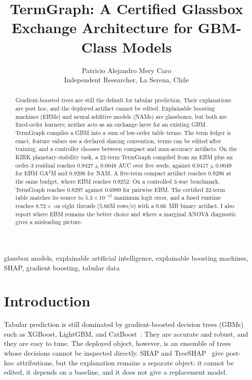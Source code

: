\documentclass[twoside,11pt]{article}
\title{TermGraph: A Certified Glassbox Exchange Architecture for GBM-Class Models}
\author{\name Patricio Alejandro Mery Caro \\
       \addr Independent Researcher, La Serena, Chile}
\begin{document}
\raggedbottom
\maketitle

\begin{abstract}
Gradient-boosted trees are still the default for tabular prediction. Their
explanations are post hoc, and the deployed artifact cannot be edited.
Explainable boosting machines (EBMs) and neural additive models (NAMs) are
glassboxes, but both are fixed-order learners; neither acts as an exchange layer
for an existing GBM. TermGraph compiles a GBM into a sum of low-order table
terms. The term ledger is exact, feature values use a declared sharing
convention, terms can be edited after training, and a controller chooses between
compact and max-accuracy artifacts. On the KIRK planetary-stability task, a
22-term TermGraph compiled from an EBM plus an order-3 residual reaches
$0.9427 \pm 0.0048$ AUC over five seeds, against $0.9417 \pm 0.0049$ for EBM
GA$^2$M and $0.9206$ for NAM. A five-term compact artifact reaches $0.9296$ at
the same budget, where EBM reaches $0.9252$. On a controlled 3-way
benchmark, TermGraph reaches $0.8297$ against $0.6989$ for pairwise EBM. The
certified 22-term table matches its source to
$5.3\times10^{-15}$ maximum logit error, and a fused runtime reaches $8.72\times$
on eight threads ($5.66$M rows/s) with a $0.66$~MB binary artifact. I also
report where EBM remains the better choice and where a marginal ANOVA
diagnostic gives a misleading picture.
\end{abstract}

\begin{keywords}
glassbox models, explainable artificial intelligence, explainable boosting machines, SHAP, gradient boosting, tabular data
\end{keywords}

\section{Introduction}

Tabular prediction is still dominated by gradient-boosted decision trees
(GBMs) such as XGBoost, LightGBM, and CatBoost~\citep{chen2016xgboost,ke2017lightgbm,prokhorenkova2018catboost}.
They are accurate and robust, and they are easy to tune. The deployed object,
however, is an ensemble of trees whose decisions cannot be inspected directly.
SHAP and TreeSHAP~\citep{lundberg2017shap,lundberg2020tree} give post-hoc
attributions, but the explanation remains a separate object: it cannot be
edited, it depends on a baseline, and it does not give a replacement model.
\end{document}
